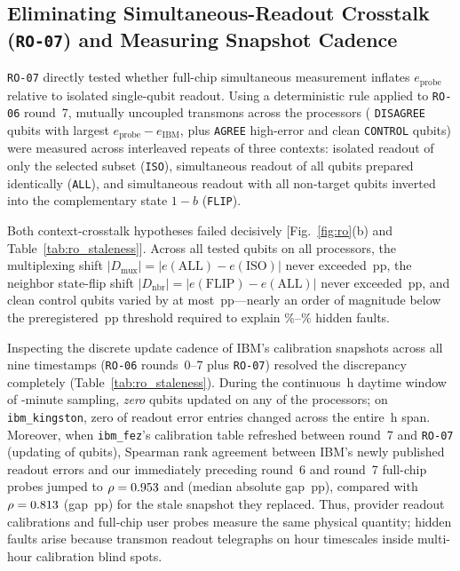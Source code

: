 \documentclass[twocolumn,aps,prapplied,superscriptaddress,floatfix]{revtex4-2}
\begin{document}
\subsection{Eliminating Simultaneous-Readout Crosstalk (\texttt{RO-07}) and Measuring Snapshot Cadence}

\texttt{RO-07} directly tested whether full-chip simultaneous measurement inflates $e_{\mathrm{probe}}$ relative to isolated single-qubit readout. Using a deterministic rule applied to \texttt{RO-06} round~7, \RoSevenTestedQubits{} mutually uncoupled transmons across the \NumBackends{} processors (\RoSevenDisagreeTotal{} \texttt{DISAGREE} qubits with largest $e_{\mathrm{probe}} - e_{\mathrm{IBM}}$, plus \texttt{AGREE} high-error and clean \texttt{CONTROL} qubits) were measured across \RoSevenRepeats{} interleaved repeats of three contexts: isolated readout of only the selected subset (\texttt{ISO}), simultaneous readout of all \ChipQubits{} qubits prepared identically (\texttt{ALL}), and simultaneous readout with all non-target qubits inverted into the complementary state $1-b$ (\texttt{FLIP}).

Both context-crosstalk hypotheses failed decisively [Fig.~\ref{fig:ro}(b) and Table~\ref{tab:ro_staleness}]. Across all \RoSevenTestedQubits{} tested qubits on all \NumBackends{} processors, the multiplexing shift $|D_{\mathrm{mux}}| = |e(\mathrm{ALL}) - e(\mathrm{ISO})|$ never exceeded \RoSevenMaxMuxPp\,pp, the neighbor state-flip shift $|D_{\mathrm{nbr}}| = |e(\mathrm{FLIP}) - e(\mathrm{ALL})|$ never exceeded \RoSevenMaxNbrPp\,pp, and clean control qubits varied by at most \RoSevenControlsMaxPp\,pp—nearly an order of magnitude below the preregistered \RoContextThreshPp\,pp threshold required to explain \RoFaultThreshPct\%--\TmapThreeQFortySixZeroToOnePct\% hidden faults.

Inspecting the discrete update cadence of IBM's calibration snapshots across all nine timestamps (\texttt{RO-06} rounds~0--7 plus \texttt{RO-07}) resolved the discrepancy completely (Table~\ref{tab:ro_staleness}). During the continuous \RoActiveSpanHours{}\,h daytime window of \RoSixIntervalMin{}-minute sampling, \emph{zero} qubits updated on any of the \NumBackends{} processors; on \texttt{ibm\_kingston}, zero of \ChipQubits{} readout error entries changed across the entire \RoKingstonUnchangedHours{}\,h span. Moreover, when \texttt{ibm\_fez}'s calibration table refreshed between round~7 and \texttt{RO-07} (updating \RoFezUpdatedQubits{} of \ChipQubits{} qubits), Spearman rank agreement between IBM's newly published readout errors and our immediately preceding round~6 and round~7 full-chip probes jumped to $\rho = 0.953$ and \RoFezNewRhoRoundSeven{} (median absolute gap \RoFezNewGapRoundSevenPp\,pp), compared with $\rho = 0.813$ (gap \RoFezOldGapPp\,pp) for the stale snapshot they replaced. Thus, provider readout calibrations and full-chip user probes measure the same physical quantity; hidden faults arise because transmon readout telegraphs on hour timescales inside multi-hour calibration blind spots.
\end{document}
